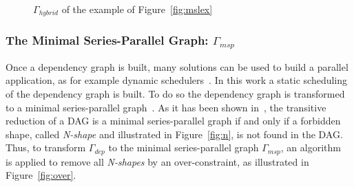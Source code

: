 \begin{figure}[t]
\begin{center}
\caption{$\Gamma_{hybrid}$ of the example of Figure~\ref{fig:mslex}}
\label{fig:hyb}
\end{center}
\end{figure}

\subsubsection*{The Minimal Series-Parallel Graph: $\Gamma_{msp}$}
Once a dependency graph is built, many solutions can be used to build a parallel application, as for example dynamic schedulers~\cite{Augonnet2011,Gautier:2013:XRS:2510661.2511383}. In this work a static scheduling of the dependency graph is built. To do so the dependency graph is transformed to a minimal series-parallel graph~\cite{Valdes:1979:RSP:800135.804393}. As it has been shown in~\cite{Valdes:1979:RSP:800135.804393}, the transitive reduction of a DAG is a minimal series-parallel graph if and only if a forbidden shape, called \emph{N-shape} and illustrated in Figure~\ref{fig:n}, is not found in the DAG. Thus, to transform $\Gamma_{dep}$ to the minimal series-parallel graph $\Gamma_{msp}$, an algorithm~\cite{Mitchell:2004:CMV:1082101.1082117} is applied to remove all \emph{N-shapes} by an over-constraint, as illustrated in Figure~\ref{fig:over}.


